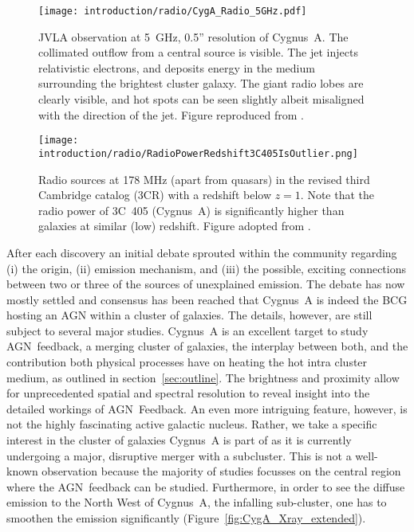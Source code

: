 \documentclass[MScProj_TLRH_ClusterEnergy.tex]{subfiles}
\begin{document}
\begin{figure}
\centering
\texttt{[image: introduction/radio/CygA\_Radio\_5GHz.pdf]}
\caption{JVLA observation at 5~GHz, 0.5'' resolution of Cygnus~A.
         The collimated outflow from a central source is visible. The jet injects 
         relativistic electrons, and deposits energy in the medium surrounding the 
         brightest cluster galaxy. The giant radio lobes are clearly visible, and hot
         spots can be seen slightly albeit misaligned with the direction of the jet.
         Figure reproduced from \citet{1996A&ARv...7....1C}.}
\label{fig:CygA_Radio}
\end{figure}

\begin{figure}
\centering
\texttt{[image: introduction/radio/RadioPowerRedshift3C405IsOutlier.png]}
\caption{Radio sources at 178 MHz (apart from quasars) in the revised third
         Cambridge catalog (3CR) with a redshift below $z=1$. Note that the
         radio power of 3C~405 (Cygnus~A) is significantly higher than galaxies
         at similar (low) redshift. Figure adopted from \citet{1996cyga.book....1S}.}
\label{fig:CygA_Radio_bright}
\end{figure}

After each discovery an initial debate sprouted within the community regarding 
(i) the origin, (ii) emission mechanism, and (iii) the possible, exciting
connections between two or three of the sources of unexplained emission.
The debate has now mostly settled and consensus has been reached that Cygnus~A
is indeed the BCG hosting an AGN within a cluster of galaxies. The details,
however, are still subject to several major studies. Cygnus~A is an excellent
target to study AGN~feedback, a merging cluster of galaxies, the interplay between
both, and the contribution both physical processes have on heating the hot intra
cluster medium, as outlined in section~\ref{sec:outline}. The brightness and proximity
allow for unprecedented spatial and spectral resolution to reveal insight into
the detailed workings of AGN~Feedback. An even more intriguing feature, however, 
is not the highly fascinating active galactic nucleus. Rather, we take a specific 
interest in the cluster of galaxies Cygnus~A is part of as it is currently 
undergoing a major, disruptive merger with a subcluster. This is not a well-known
observation because the majority of studies focusses on the central region where
the AGN~feedback can be studied. Furthermore, in order to see the diffuse
emission to the North West of Cygnus~A, the infalling sub-cluster, one has to 
smoothen the emission significantly (Figure~\ref{fig:CygA_Xray_extended}).
\end{document}
